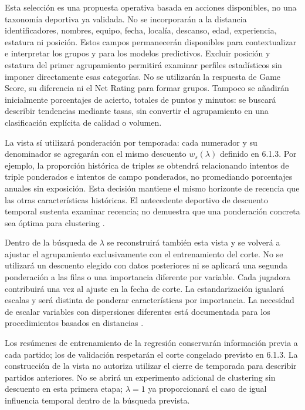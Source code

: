 Esta selección es una propuesta operativa basada en acciones disponibles, no una taxonomía deportiva ya validada. No se incorporarán a la distancia identificadores, nombres, equipo, fecha, localía, descanso, edad, experiencia, estatura ni posición. Estos campos permanecerán disponibles para contextualizar e interpretar los grupos y para los modelos predictivos. Excluir posición y estatura del primer agrupamiento permitirá examinar perfiles estadísticos sin imponer directamente esas categorías. No se utilizarán la respuesta de Game Score, su diferencia ni el Net Rating para formar grupos. Tampoco se añadirán inicialmente porcentajes de acierto, totales de puntos y minutos: se buscará describir tendencias mediante tasas, sin convertir el agrupamiento en una clasificación explícita de calidad o volumen.

La vista sí utilizará ponderación por temporada: cada numerador y su denominador se agregarán con el mismo descuento $w_s(\lambda)$ definido en 6.1.3. Por ejemplo, la proporción histórica de triples se obtendrá relacionando intentos de triple ponderados e intentos de campo ponderados, no promediando porcentajes anuales sin exposición. Esta decisión mantiene el mismo horizonte de recencia que las otras características históricas. El antecedente deportivo de descuento temporal sustenta examinar recencia; no demuestra que una ponderación concreta sea óptima para clustering \cite{dixon1997scores}.

Dentro de la búsqueda de $\lambda$ se reconstruirá también esta vista y se volverá a ajustar el agrupamiento exclusivamente con el entrenamiento del corte. No se utilizará un descuento elegido con datos posteriores ni se aplicará una segunda ponderación a las filas o una importancia diferente por variable. Cada jugadora contribuirá una vez al ajuste en la fecha de corte. La estandarización igualará escalas y será distinta de ponderar características por importancia. La necesidad de escalar variables con dispersiones diferentes está documentada para los procedimientos basados en distancias \cite{sklearnScalerPerfiles}.

Los resúmenes de entrenamiento de la regresión conservarán información previa a cada partido; los de validación respetarán el corte congelado previsto en 6.1.3. La construcción de la vista no autoriza utilizar el cierre de temporada para describir partidos anteriores. No se abrirá un experimento adicional de clustering sin descuento en esta primera etapa; $\lambda=1$ ya proporcionará el caso de igual influencia temporal dentro de la búsqueda prevista.

